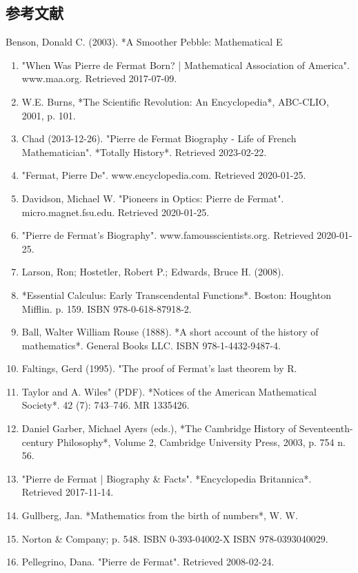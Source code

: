 \subsection{参考文献}  
\item Benson, Donald C. (2003). *A Smoother Pebble: Mathematical E\begin{enumerate}
xplorations*, Oxford University Press, p. 176.  
\item "When Was Pierre de Fermat Born? | Mathematical Association of America". www.maa.org. Retrieved 2017-07-09.  
\item W.E. Burns, *The Scientific Revolution: An Encyclopedia*, ABC-CLIO, 2001, p. 101.  
\item Chad (2013-12-26). "Pierre de Fermat Biography - Life of French Mathematician". *Totally History*. Retrieved 2023-02-22.  
\item "Fermat, Pierre De". www.encyclopedia.com. Retrieved 2020-01-25.  
\item Davidson, Michael W. "Pioneers in Optics: Pierre de Fermat". micro.magnet.fsu.edu. Retrieved 2020-01-25.  
\item "Pierre de Fermat's Biography". www.famousscientists.org. Retrieved 2020-01-25.  
\item Larson, Ron; Hostetler, Robert P.; Edwards, Bruce H. (2008). \item *Essential Calculus: Early Transcendental Functions*. Boston: Houghton Mifflin. p. 159. ISBN 978-0-618-87918-2.  
\item Ball, Walter William Rouse (1888). *A short account of the history of mathematics*. General Books LLC. ISBN 978-1-4432-9487-4.  
\item Faltings, Gerd (1995). "The proof of Fermat's last theorem by R. \item Taylor and A. Wiles" (PDF). *Notices of the American Mathematical Society*. 42 (7): 743–746. MR 1335426.  
\item Daniel Garber, Michael Ayers (eds.), *The Cambridge History of Seventeenth-century Philosophy*, Volume 2, Cambridge University Press, 2003, p. 754 n. 56.  
\item "Pierre de Fermat | Biography & Facts". *Encyclopedia Britannica*. Retrieved 2017-11-14.  
\item Gullberg, Jan. *Mathematics from the birth of numbers*, W. W. \item Norton & Company; p. 548. ISBN 0-393-04002-X ISBN 978-0393040029.  
\item Pellegrino, Dana. "Pierre de Fermat". Retrieved 2008-02-24.  

\end{enumerate}
